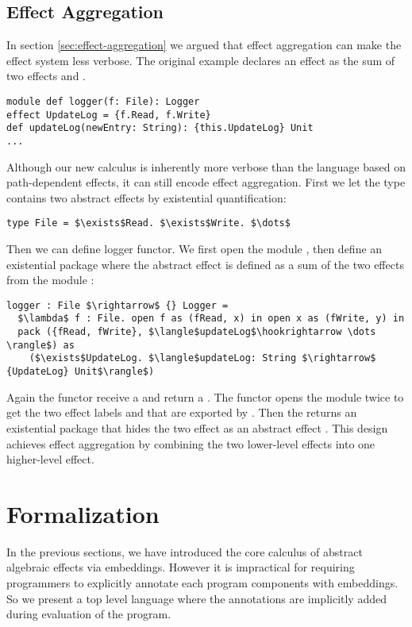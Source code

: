 \subsection{Effect Aggregation}
In section \ref{sec:effect-aggregation} we argued that effect aggregation can make the effect system less verbose. The original example declares an effect  as the sum of two effects  and . 
\begin{lstlisting}[xleftmargin=-5pt, numbers=none]
module def logger(f: File): Logger
effect UpdateLog = {f.Read, f.Write}
def updateLog(newEntry: String): {this.UpdateLog} Unit
...
\end{lstlisting}
Although our new calculus is inherently more verbose than the language based on path-dependent effects, it can still encode effect aggregation. First we let the  type contains two abstract effects by existential quantification:
\begin{lstlisting}[mathescape=true]
type File = $\exists$Read. $\exists$Write. $\dots$
\end{lstlisting}
Then we can define logger functor. We first open the module , then define an existential package where the abstract effect is defined as a sum of the two effects from the module :
\begin{lstlisting}[mathescape=true]
logger : File $\rightarrow$ {} Logger = 
  $\lambda$ f : File. open f as (fRead, x) in open x as (fWrite, y) in 
  pack ({fRead, fWrite}, $\langle$updateLog$\hookrightarrow \dots \rangle$) as 
    ($\exists$UpdateLog. $\langle$updateLog: String $\rightarrow$ {UpdateLog} Unit$\rangle$)
\end{lstlisting}
Again the functor  receive a  and return a . The functor opens the  module twice to get the two effect labels  and  that are exported by . Then the  returns an existential package that hides the two effect as an abstract effect . This design achieves effect aggregation by combining the two lower-level effects into one higher-level effect.




\section{Formalization}
\label{sec-exist}
In the previous sections, we have introduced the core calculus of abstract algebraic effects via embeddings. However it is  impractical for requiring programmers to explicitly annotate each program components with embeddings. So we present a top level language where the annotations are implicitly added during evaluation of the program.  

